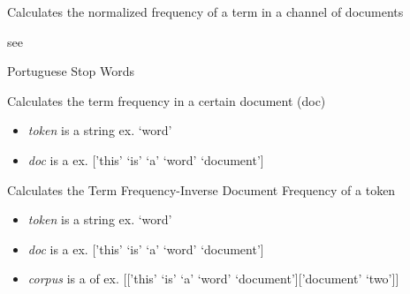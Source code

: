 \documentclass[letterpaper,10pt,english]{sphinxmanual}
\begin{document}

\begin{fulllineitems}
\label{theseus:theseus.processor.theseus.normF}
Calculates the normalized frequency of a term in a channel of documents

see {\hyperref[theseus:theseus.processor.theseus.tfpdf]{}}

\end{fulllineitems}


\begin{fulllineitems}
\label{theseus:theseus.processor.theseus.ptClean}
Portuguese Stop Words

\end{fulllineitems}


\begin{fulllineitems}
\label{theseus:theseus.processor.theseus.tf}
Calculates the term frequency in a certain document (doc)
\begin{itemize}
\item {} 
\emph{token} is a string   ex. `word'

\item {} 
\emph{doc} is a      ex. {[}'this' `is' `a' `word' `document'{]}

\end{itemize}

\end{fulllineitems}


\begin{fulllineitems}
\label{theseus:theseus.processor.theseus.tfidf}
Calculates the Term Frequency-Inverse Document Frequency of a token
\begin{itemize}
\item {} 
\emph{token} is a string               ex. `word'

\item {} 
\emph{doc} is a                  ex. {[}'this' `is' `a' `word' `document'{]}

\item {} 
\emph{corpus} is a  of     ex. {[}{[}'this' `is' `a' `word' `document'{]}{[}'document' `two'{]}{]}

\end{itemize}

\end{fulllineitems}
\end{document}
